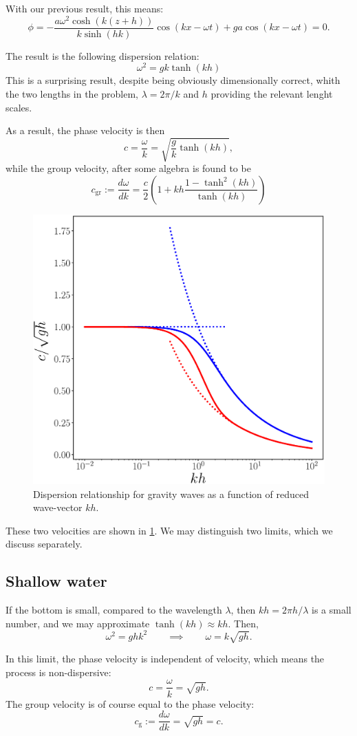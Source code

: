 With our previous result, this means:
\[
\phi =  - \frac{a \omega^2  \cosh(k(z+h)) }{ k \sinh(hk)  }  \cos(kx -\omega t ) +
g a \cos(kx -\omega t ) =0 .
\]

The result is the following dispersion relation:
\[
\omega^2= g k \tanh(k h)
\]
This is a surprising result, despite being obviously dimensionally
correct, whith the two lengths in the problem, $\lambda=2\pi/k$ and
$h$ providing the relevant lenght scales.



As a result, the phase velocity is then
\[
  c= \frac{\omega}{k} = \sqrt{ \frac{g}{k}  \tanh(k h) } ,
\]
while the group velocity, after some algebra is found to be
\[
  c_\mathrm{gr} := \frac{d\omega}{dk} =
  \frac{c}{2}
  \left(
    1 + kh \frac{1- \tanh^{2}(kh)}{\tanh(k h)}
  \right)
\]

\begin{figure}
  \centering
  \includegraphics[width=0.4\linewidth]{figures/gravity_waves_disp}
  \caption{Dispersion relationship for gravity waves as a function of
    reduced wave-vector $kh$. \label{fig:gravity_waves_disp}}
\end{figure}

These two velocities are shown in \ref{fig:gravity_waves_disp}. We may
distinguish two limits, which we discuss separately.

\subsection{Shallow water}
If the bottom is small, compared to the wavelength $\lambda$, then
$kh = 2\pi h / \lambda $ is a small number, and we may approximate
$\tanh(kh)\approx kh$. Then,
\[
\omega^2= g h  k^2 \qquad \implies \qquad \omega= k \sqrt{g h} .
\]

In this limit, the phase velocity is independent of velocity, which
means the process is non-dispersive:
\[
c =  \frac{\omega}{k} = \sqrt{ g h }  .
\]
The group velocity is of course equal to the phase velocity:
\[
c_\mathrm{g} := \frac{d\omega}{dk} = \sqrt{ g h } = c.
\]

